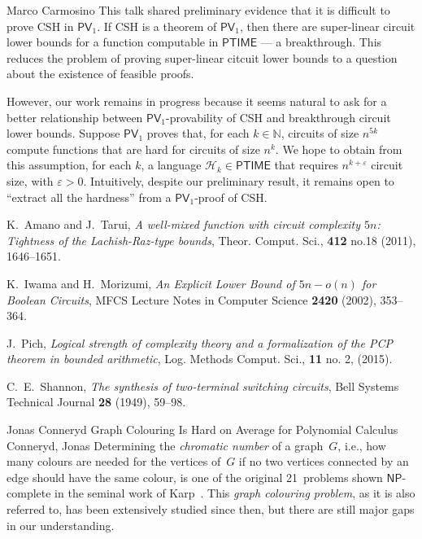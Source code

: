 \documentclass[report]{owrart}
\begin{document}
\begin{report}
\begin{talk}{Marco Carmosino}
      This talk shared preliminary evidence that it is difficult to prove CSH in $\mathsf{PV}_1$.  If CSH is a theorem of $\mathsf{PV}_1$, then there are super-linear circuit lower bounds for a function computable in $\mathsf{PTIME}$ --- a breakthrough. This reduces the problem of proving super-linear citcuit lower bounds to a question about the existence of feasible proofs.
      
      However, our work remains in progress because it seems natural to ask for a better relationship between $\mathsf{PV}_1$-provability of CSH and breakthrough circuit lower bounds.  Suppose $\mathsf{PV}_1$ proves that, for each $k \in \mathbb{N}$, circuits of size $n^{5k}$ compute functions that are hard for circuits of size $n^k$.  We hope to obtain from this assumption, for each $k$, a language $\mathcal{H}_k \in \mathsf{PTIME}$ that requires $n^{k + \varepsilon}$ circuit size, with $\varepsilon >0$.  Intuitively, despite our preliminary result, it remains open to ``extract all the hardness'' from a $\mathsf{PV}_1$-proof of CSH.
      
      \begin{thebibliography}{99}
      
      K.~Amano and J.~Tarui, \textit{A well-mixed function with circuit complexity $5n$: Tightness of the Lachish-Raz-type bounds}, Theor. Comput. Sci., \textbf{412} no.18 (2011), 1646--1651.
      
      K.~Iwama and H.~Morizumi, \textit{An Explicit Lower Bound of $5n - o(n)$ for Boolean Circuits}, MFCS Lecture Notes in Computer Science \textbf{2420} (2002), 353--364.
      
      J.~Pich, \textit{Logical strength of complexity theory and a formalization of the {PCP} theorem in bounded arithmetic}, Log. Methods Comput. Sci., \textbf{11} no. 2, (2015).
      
      C.~E.~Shannon, \textit{The synthesis of two-terminal switching circuits}, Bell Systems Technical Journal \textbf{28} (1949), 59--98.
      
      
      \end{thebibliography}
      
      \end{talk}


\begin{talk}{Jonas Conneryd}
  {Graph Colouring Is Hard on Average for Polynomial Calculus}
  {Conneryd, Jonas}
\noindent
  Determining the \emph{chromatic number} of a graph~$G$, i.e.,
how many colours are needed for the vertices of~$G$ if no two vertices
connected by an edge should have the same colour,
is one of the
original
21~problems shown $\mathsf{NP}$-complete in the seminal work of
Karp~\cite{Karp72Reducibility}.
This
\emph{graph colouring problem},
as it is also referred to, has been
extensively studied since then,
but there are still major gaps in our understanding.


\end{talk}
\end{report}
\end{document}
